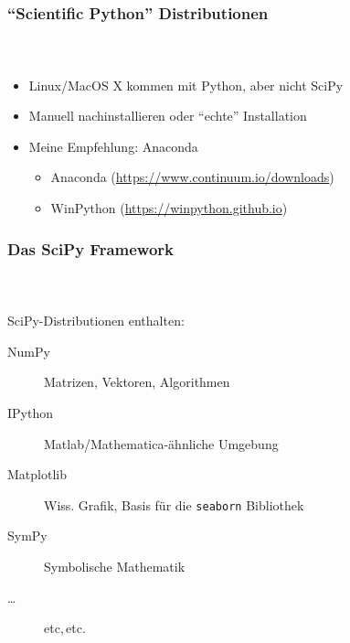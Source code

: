 \documentclass[12pt,ngerman]{beamer}
\begin{document}
\begin{frame}
\frametitle{\enquote{Scientific Python} Distributionen}
\framesubtitle{~}

\begin{itemize}
	\item Linux/MacOS X kommen mit Python, aber nicht SciPy
	\item Manuell nachinstallieren oder \enquote{echte} Installation
	\item Meine Empfehlung: Anaconda
\begin{itemize}
	\item Anaconda (\url{https://www.continuum.io/downloads})
	\item WinPython (\url{https://winpython.github.io})
\end{itemize}
	\end{itemize}
	
\begin{center} %
\end{center}	
\end{frame}

\begin{frame}
\frametitle{Das SciPy Framework}
\framesubtitle{~}

SciPy-Distributionen enthalten:

\begin{description}
\item[NumPy] Matrizen, Vektoren, Algorithmen
\item[IPython] Matlab/Mathematica-ähnliche Umgebung
\item[Matplotlib] Wiss. Grafik, Basis für die \texttt{seaborn} Bibliothek
\item[SymPy] Symbolische Mathematik
\item [\ldots] etc,\,etc.
\end{description}
\end{frame}
\end{document}
